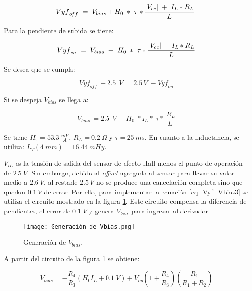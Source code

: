 \begin{equation} \label{eq_Vyf-Vbias}
	{Vyf}_{off}\ =\ V_{bias}+H_0\ *\ \tau *\frac{\abs{V_{cc}}\ +\ I_L*R_L}{L}\ 
\end{equation}

Para la pendiente de subida se tiene:

\begin{equation} \label{eq_Vyf-Vbias2}
	{Vyf}_{on}\ =\ V_{bias}\ -\ H_0\ *\ \tau *\frac{\abs{V_{cc}} -\ I_L*R_L}{L}
\end{equation}

Se desea que se cumpla:

\begin{equation} \label{eq_Vyf_Vbias3}
	{Vyf}_{off}\ -2.5\ \:V=\ 2.5\ V\ -{Vyf}_{on}
\end{equation}

Si se despeja $V_{bias}$ se llega a:

\begin{equation} \label{eq_Vyf-Vbias4}
	V_{bias}\ =2.5\ \:V -\ H_0\ *I_L*\ \tau *\frac{\ R_L}{L}
\end{equation}

Se tiene $H_0 = 53.3\:\frac{mV}{A},\; R_L = 0.2\:\Omega$ y $\tau  = 25 \:ms$. En cuanto a la inductancia, se utiliza:  $L_T(4\:mm) = 16.44\:mHy$.

$V_{iL}$ es la tensión de salida del sensor de efecto Hall menos el punto de operación de $2.5\:V$. Sin embargo, debido al \textsl{offset} agregado al sensor para llevar su valor medio a $2.6\:V$, al restarle $2.5\:V$ no se produce una cancelación completa sino que quedan $0.1\:V$ de error. Por ello, para implementar la ecuación  \ref{eq_Vyf_Vbias3} se utiliza el circuito mostrado en la figura \ref{fig:img_Generación_de_Vbias}. Este circuito compensa la diferencia de pendientes, el error de $0.1\:V$ y genera $V_{bias}$ para ingresar al derivador.

\begin{figure}[H]
	\centering
	\texttt{[image: Generación-de-Vbias.png]}
	\caption{Generación de $V_{bias}$.}
	\label{fig:img_Generación_de_Vbias}
\end{figure}

A partir del circuito de la figura \ref{fig:img_Generación_de_Vbias} se obtiene:

\begin{equation} \label{eq_Vyf-Vbias3}
	V_{bias} =-\frac{R_4}{R_3}(H_0I_L+ 0.1\:V)+V_{op}(1+\frac{ R_4}{R_3})(\frac{R_1}{R_1+R_2})
\end{equation}

